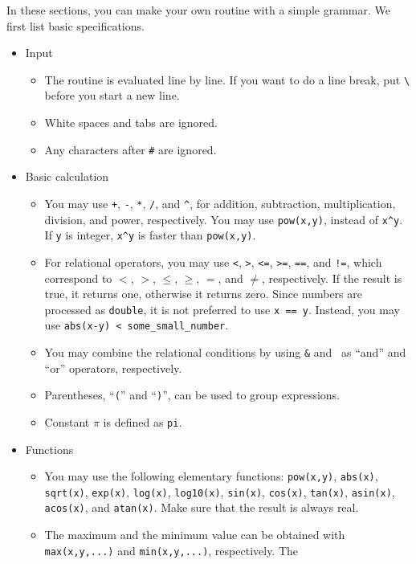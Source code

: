 \documentclass[12pt]{article}
\begin{document}
In these sections, you can make your own routine with a simple grammar.
We first list basic specifications.
\begin{itemize}
 \item Input
\begin{itemize}
 \item The routine is evaluated line by line. If you want to do a line
       break, put \verb|\| before you start a new line.
 \item White spaces and tabs are ignored.
 \item Any characters after \verb|#| are ignored.
\end{itemize}
 \item Basic calculation
\begin{itemize}
 \item You may use
       \verb|+|, \verb|-|, \verb|*|, \verb|/|, and \verb|^|, for  addition, subtraction, multiplication, division, and power, respectively. You may use \verb|pow(x,y)|, instead of \verb|x^y|. If \verb|y| is integer, \verb|x^y| is faster than \verb|pow(x,y)|.
 \item For relational operators, you may use
       \verb|<|, \verb|>|, \verb|<=|, \verb|>=|, \verb|==|, and \verb|!=|,
       which correspond to $<$, $>$, $\leq$, $\geq$, $=$, and $\neq$,
       respectively. If the result is true, it returns one, otherwise it
       returns zero. Since numbers are processed as
       \verb|double|, it is not preferred to use \verb|x == y|. Instead, you may
       use \verb|abs(x-y) < some_small_number|.
 \item You may combine the relational conditions by using \verb|&| and \textbar~as ``and'' and ``or'' operators, respectively.
 \item Parentheses, ``\verb|(|'' and ``\verb|)|'', can be used to group expressions.
 \item Constant $\pi$ is defined as \verb|pi|.
\end{itemize}
\item Functions
\begin{itemize}
 \item You may use the following elementary functions: \verb|pow(x,y)|, \verb|abs(x)|,
       \verb|sqrt(x)|, \verb|exp(x)|, \verb|log(x)|, \verb|log10(x)|, \verb|sin(x)|, \verb|cos(x)|, \verb|tan(x)|, \verb|asin(x)|, \verb|acos(x)|, and \verb|atan(x)|. Make sure that the result is always real.
 \item The maximum and the minimum value can be obtained with
       \verb|max(x,y,...)| and \verb|min(x,y,...)|, respectively. The

\end{itemize}
\end{itemize}
\end{document}
